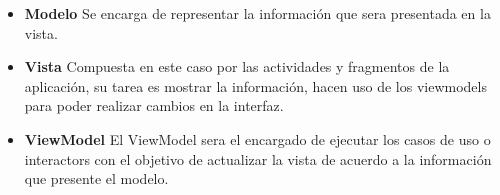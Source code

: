\begin{itemize}
	\item \textbf{Modelo} Se encarga de representar la información que sera presentada en la vista.
	\item \textbf{Vista} Compuesta en este caso por las actividades y fragmentos de la aplicación, su tarea es mostrar la información, hacen uso de los viewmodels para poder realizar cambios en la interfaz.
	\item \textbf{ViewModel} El ViewModel sera el encargado de ejecutar los casos de uso o interactors con el objetivo de actualizar la vista de acuerdo a la información que presente el modelo.
\end{itemize}


